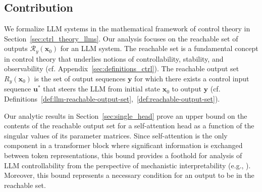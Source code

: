 \documentclass{article} %
\begin{document}
\subsection{Contribution}

We formalize LLM systems in the mathematical framework of control theory in Section~\ref{sec:ctrl_theory_llms}.
Our analysis focuses on the reachable set of outputs $\mathcal R_y (\mathbf x_0)$ for an LLM system.
The reachable set is a fundamental concept in control theory that underlies notions of controllability, stability, and observability (cf. Appendix~\ref{sec:definitions_ctrl}). 
The reachable output set $R_y(\mathbf x_0)$ is the set of output sequences $\mathbf y$ for which there exists a control input sequence $\mathbf u^*$ that steers the LLM from initial state $\mathbf x_0$ to output $\mathbf y$ (cf. Definitions~\ref{def:llm-reachable-output-set},~\ref{def:reachable-output-set}). 

Our analytic results in Section~\ref{sec:single_head} prove an upper bound on the contents of the reachable output set for a self-attention head as a function of the singular values of its parameter matrices. 
Since self-attention is the only component in a transformer block where significant information is exchanged between token representations, this bound provides a foothold for analysis of LLM controllability from the perspective of mechanistic interpretability (e.g., \cite{bricken2023monosemanticity, chefer2021transformer, conmy2023automated}). Moreover, this bound represents a necessary condition for an output to be in the reachable set.
\end{document}
